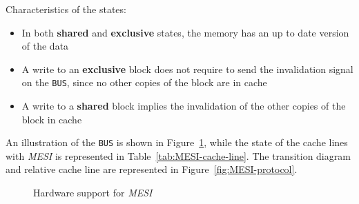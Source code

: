 \documentclass[english]{article}
\begin{document}
Characteristics of the states:

\begin{itemize}
  \item In both \textbf{shared} and \textbf{exclusive} states, the memory has an up to date version of the data
  \item A write to an \textbf{exclusive} block does not require to send the invalidation signal on the \texttt{BUS}, since no other copies of the block are in cache
  \item A write to a \textbf{shared} block implies the invalidation of the other copies of the block in cache
\end{itemize}

\bigskip
An illustration of the \texttt{BUS} is shown in Figure~\ref{subfig:MESI-bus-rd}, while the state of the cache lines with \textit{MESI} is represented in Table~\ref{tab:MESI-cache-line}.
The transition diagram and relative cache line are represented in Figure~\ref{fig:MESI-protocol}.

\begin{figure}[htbp]
  \centering
  \bigskip
  \caption{Hardware support for \textit{MESI}}
  \label{subfig:MESI-bus-rd}
  \bigskip
\end{figure}
\end{document}
